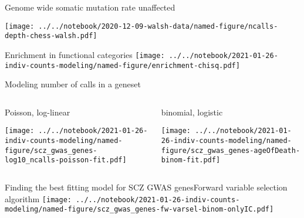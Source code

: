 \documentclass[usenames,dvipsnames]{beamer}
\begin{document}
\begin{frame}{Genome wide somatic mutation rate unaffected}
\begin{center}
\texttt{[image: ../../notebook/2020-12-09-walsh-data/named-figure/ncalls-depth-chess-walsh.pdf]}
\end{center}
\end{frame}

\begin{frame}{Enrichment in functional categories}
\texttt{[image: ../../notebook/2021-01-26-indiv-counts-modeling/named-figure/enrichment-chisq.pdf]}
\end{frame}

\begin{frame}{Modeling number of calls in a geneset}
\begin{columns}[t]
\begin{column}{0.5\textwidth}
\begin{center}
Poisson, log-linear
\end{center}
\texttt{[image: ../../notebook/2021-01-26-indiv-counts-modeling/named-figure/scz\_gwas\_genes-log10\_ncalls-poisson-fit.pdf]}
\end{column}

\begin{column}{0.5\textwidth}
\begin{center}
binomial, logistic
\end{center}
\texttt{[image: ../../notebook/2021-01-26-indiv-counts-modeling/named-figure/scz\_gwas\_genes-ageOfDeath-binom-fit.pdf]}
\end{column}
\end{columns}
\begin{center}
\end{center}
\end{frame}

\begin{frame}{Finding the best fitting model for SCZ GWAS genes}{Forward variable selection algorithm}
\texttt{[image: ../../notebook/2021-01-26-indiv-counts-modeling/named-figure/scz\_gwas\_genes-fw-varsel-binom-onlyIC.pdf]}
\end{frame}
\end{document}
